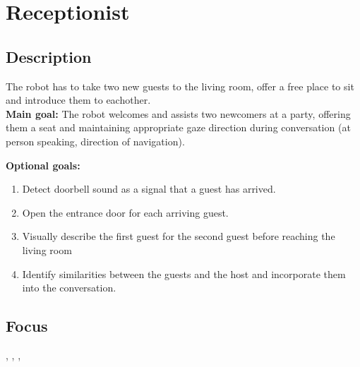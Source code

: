 \section{Receptionist}
\label{test:receptionist}

\subsection*{Description}
The robot has to take two new guests to the living room, offer a free place to sit and introduce them to eachother.\\
    
\textbf{Main goal:}
    The robot welcomes and assists two newcomers at a party, offering them a seat and maintaining appropriate gaze direction during conversation (at person speaking, direction of navigation).

\textbf{Optional goals:}
\begin{enumerate}[nosep]
	\item Detect doorbell sound as a signal that a guest has arrived.
	\item Open the entrance door for each arriving guest.
	\item Visually describe the first guest for the second guest before reaching the living room
	\item Identify similarities between the guests and the host and incorporate them into the conversation.
\end{enumerate}

\subsection*{Focus}
\emph{\SysI{}}, \emph{\HRI{}}, \emph{\PerDet{}}, \emph{\PerRec{}}

